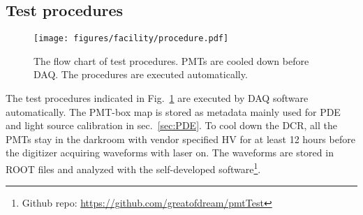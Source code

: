 \subsection{Test procedures}
\begin{figure}
    \centering
    \texttt{[image: figures/facility/procedure.pdf]}
    \caption{The flow chart of test procedures. PMTs are cooled down before DAQ. The procedures are executed automatically.}
    \label{fig:testingprocedure}
\end{figure}

The test procedures indicated in Fig.~\ref{fig:testingprocedure} are executed by DAQ software automatically. The PMT-box map is stored as metadata mainly used for PDE and light source calibration in sec.~\ref{sec:PDE}. To cool down the DCR, all the PMTs stay in the darkroom with vendor specified HV for at least 12 hours before the digitizer acquiring waveforms with laser on. The waveforms are stored in ROOT files and analyzed with the self-developed software\footnote{Github repo: \url{https://github.com/greatofdream/pmtTest}}.
